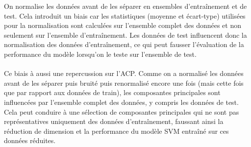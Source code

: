 \documentclass[a4paper, 12pt]{article}
\begin{document}
On normalise les données avant de les séparer en ensembles d'entraînement et de test. Cela introduit un biais car les statistiques (moyenne et écart-type) utilisées pour la normalisation sont calculées sur l'ensemble complet des données et non seulement sur l'ensemble d'entraînement.
Les données de test influencent donc la normalisation des données d'entraînement, ce qui peut fausser l'évaluation de la performance du modèle lorsqu'on le teste sur l'ensemble de test.
\\
\\
Ce biais à aussi une repercussion sur l'ACP. Comme on a normalisé les données avant de les séparer puis bruité puis renormalisé encore une fois (mais cette fois que par rapport aux données de train), les composantes principales sont influencées par l'ensemble complet des données, y compris les données de test. Cela peut conduire à une sélection de composantes principales qui ne sont pas représentatives uniquement des données d'entraînement, faussant ainsi la réduction de dimension et la performance du modèle SVM entraîné sur ces données réduites.
\end{document}
